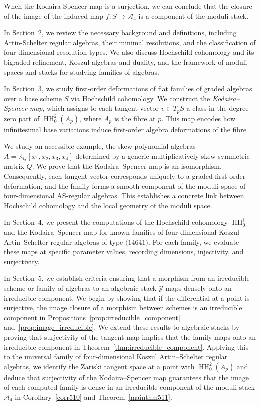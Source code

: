 \documentclass{amsart}
\def\HH{\operatorname{HH}}
\begin{document}
When the Kodaira-Spencer map is a surjection, we can conclude that the closure of the image of the induced map $f : S \to \mathcal{A}_4$ is a component of the moduli stack.  

{In Section~2,} we review the necessary background and definitions, including Artin-Schelter regular algebras, their minimal resolutions, and the classification of four-dimensional resolution types. We also discuss Hochschild cohomology and its bigraded refinement, Koszul algebras and duality, and the framework of moduli spaces and stacks for studying families of algebras.

{In Section~3,} we study first-order deformations of flat families of graded algebras over a base scheme $S$ via Hochschild cohomology. We construct the \emph{Kodaira--Spencer map}, which assigns to each tangent vector $v \in T_p S$ a class in the degree-zero part of $\HH^2_0(A_p)$, where $A_p$ is the fibre at $p$. This map encodes how infinitesimal base variations induce first-order algebra deformations of the fibre.


We study an accessible example,
the skew polynomial algebras $A = \mathbb{K}_Q[x_1, x_2, x_3, x_4]$ determined by a generic multiplicatively skew-symmetric matrix $Q$. We prove that the Kodaira--Spencer map is an isomorphism. Consequently, each tangent vector corresponds uniquely to a graded first-order deformation, and the family forms a smooth component of the moduli space of four-dimensional AS-regular algebras. This establishes a concrete link between Hochschild cohomology and the local geometry of the moduli space.


 {In Section~4,} we present the computations of  the Hochschild cohomology $\HH_0^i$ and the Kodaira--Spencer map for known families of four-dimensional Koszul Artin--Schelter regular algebras of type $\textit{(14641)}$. For each family, we evaluate these maps at specific parameter values, recording dimensions, injectivity, and surjectivity.

{In Section~5,} we establish criteria ensuring that a morphism from an irreducible scheme or family of algebras to an algebraic stack $\mathcal{Y}$ maps densely onto an irreducible component. We begin by showing that if the differential at a point is surjective, the image closure of a morphism between schemes is an irreducible component in Propositions~\ref{prop:irreducible_component} and~\ref{prop:image_irreducible}. We extend these results to algebraic stacks by proving that surjectivity of the tangent map implies that the family maps onto an irreducible component in Theorem~\ref{thm:irreducible_component}. Applying this to the universal family of four-dimensional Koszul Artin--Schelter regular algebras, we identify the Zariski tangent space at a point with $\HH^2_0(A_p)$ and deduce that surjectivity of the Kodaira--Spencer map guarantees that the image of each computed family is dense in an irreducible component of the moduli stack $\mathcal{A}_4$ in Corollary~\ref{corr510} and Theorem~\ref{mainthm511}.  
\end{document}
